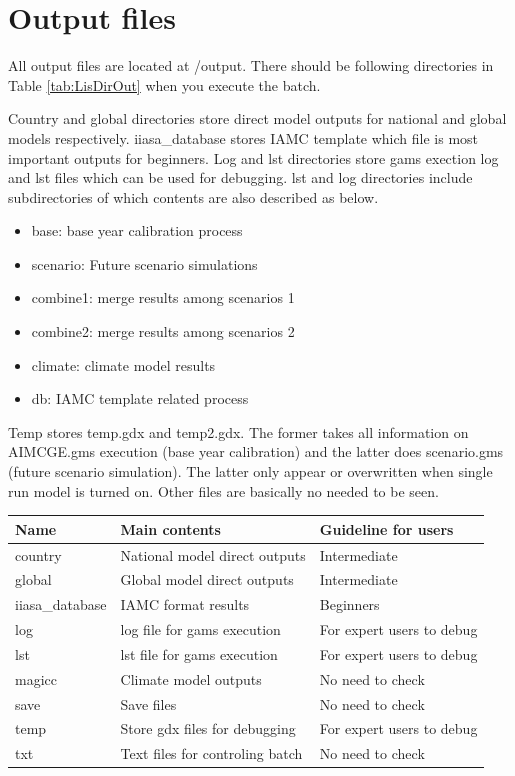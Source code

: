 \documentclass[10pt,a4paper,titlepage,dvipdfmx]{book}
\begin{document}
\section{\label{sec:OutFile}Output files}

    All output files are located at /output. There should be following directories in Table \ref{tab:LisDirOut} when you execute the batch.

Country and global directories store direct model outputs for national and global models respectively. iiasa\_database stores IAMC template which file is most important outputs for beginners.
Log and lst directories store gams exection log and lst files which can be used for debugging. lst and log directories include subdirectories of which contents are also described as below.  
\begin{itemize}
\item base: base year calibration process 
\item scenario: Future scenario simulations 
\item combine1: merge results among scenarios 1
\item combine2: merge results among scenarios 2
\item climate: climate model results
\item db: IAMC template related process
\end{itemize}
  Temp stores temp.gdx and temp2.gdx. 
The former takes all information on AIMCGE.gms execution (base year calibration) and the latter does scenario.gms (future scenario simulation). The latter only appear or overwritten when single run model is turned on. Other files are basically no needed to be seen.


\begin{tabularx}{\textwidth}{|
p{}|
p{}|
p{}|} 
\caption{\label{tab:LisDirOut} list of directories in ''output''} \\
\hline 
Name & Main contents & Guideline for users \\\hline 
country & National model direct outputs & Intermediate \\\hline 
global & Global model direct outputs & Intermediate \\\hline 
iiasa\_database & IAMC format results & Beginners \\\hline 
log & log file for gams execution & For expert users to debug \\\hline 
lst & lst file for gams execution & For expert users to debug \\\hline 
magicc & Climate model outputs & No need to check \\\hline 
save & Save files & No need to check \\\hline 
temp & Store gdx files for debugging & For expert users to debug \\\hline 
txt & Text files for controling batch & No need to check \\\hline 
\end{tabularx}
\end{document}
